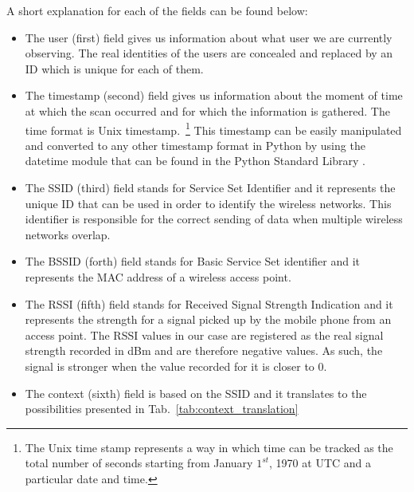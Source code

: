 A short explanation for each of the fields can be found below:
\begin{itemize}
\item The user (first) field gives us information about what user we are
currently observing. The real identities of the users are concealed and replaced by an ID
which is unique for each of them.
\item The timestamp (second) field gives us information about the moment of time
at which the scan occurred and for which the information is gathered. The time
format is Unix timestamp.~\footnote{The Unix time stamp represents a way in
which time can be tracked as the total number of seconds starting from January
$1^{st}$, 1970 at UTC and a particular date and time.} This timestamp can be
easily manipulated and converted to any other timestamp format in Python by
using the datetime module that can be found in the Python Standard Library
\cite{PSL}.
\item The SSID (third) field stands for Service Set Identifier and it represents
the unique ID that can be used in order to identify the wireless networks. This
identifier is responsible for the correct sending of data when multiple wireless
networks overlap.
\item The BSSID (forth) field stands for Basic Service Set identifier and it
represents the MAC address of a wireless access point.
\item The RSSI (fifth) field stands for Received Signal Strength Indication and
it represents the strength for a signal picked up by the mobile phone from an
access point. The RSSI values in our case are registered as the real signal
strength recorded in dBm and are therefore negative values. As such, the signal
is stronger when the value recorded for it is closer to $0$.
\item The context (sixth) field is based on the SSID and it translates to the
possibilities presented in Tab.~\ref{tab:context_translation}
\end{itemize}

